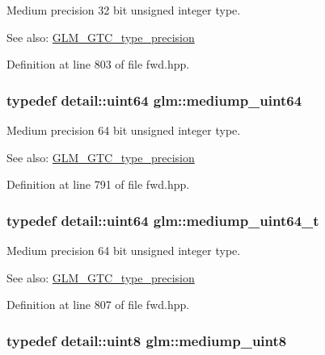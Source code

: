 Medium precision 32 bit unsigned integer type. \begin{Desc}
\item[See also:]\hyperlink{group__gtc__type__precision}{GLM\_\-GTC\_\-type\_\-precision} \end{Desc}


Definition at line 803 of file fwd.hpp.\hypertarget{group__gtc__type__precision_g6685788d15d0a973ee7c2460d0456dc1}{
\subsubsection[mediump\_\-uint64]{\setlength{\rightskip}{0pt plus 5cm}typedef detail::uint64 {\bf glm::mediump\_\-uint64}}}
\label{group__gtc__type__precision_g6685788d15d0a973ee7c2460d0456dc1}


Medium precision 64 bit unsigned integer type. \begin{Desc}
\item[See also:]\hyperlink{group__gtc__type__precision}{GLM\_\-GTC\_\-type\_\-precision} \end{Desc}


Definition at line 791 of file fwd.hpp.\hypertarget{group__gtc__type__precision_ga97354d3120a6dc029a5e9563723de18}{
\subsubsection[mediump\_\-uint64\_\-t]{\setlength{\rightskip}{0pt plus 5cm}typedef detail::uint64 {\bf glm::mediump\_\-uint64\_\-t}}}
\label{group__gtc__type__precision_ga97354d3120a6dc029a5e9563723de18}


Medium precision 64 bit unsigned integer type. \begin{Desc}
\item[See also:]\hyperlink{group__gtc__type__precision}{GLM\_\-GTC\_\-type\_\-precision} \end{Desc}


Definition at line 807 of file fwd.hpp.\hypertarget{group__gtc__type__precision_gc4b849eaac0543a10f97f4bdda4850a8}{
\subsubsection[mediump\_\-uint8]{\setlength{\rightskip}{0pt plus 5cm}typedef detail::uint8 {\bf glm::mediump\_\-uint8}}}
\label{group__gtc__type__precision_gc4b849eaac0543a10f97f4bdda4850a8}


